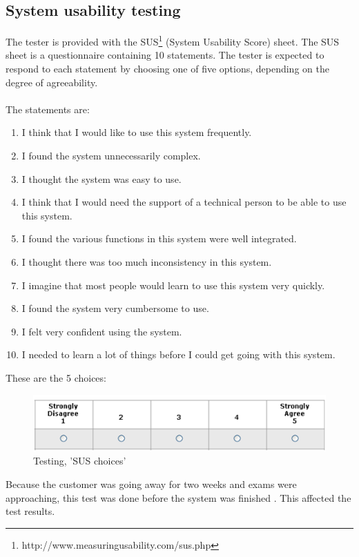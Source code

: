 
\subsection{System usability testing}
The tester is provided with the SUS\footnote{http://www.measuringusability.com/sus.php} (System Usability Score) sheet. The SUS sheet is a questionnaire containing 10 statements. The tester is expected to respond to each statement by choosing one of five options, depending on the degree of agreeability.\\
\\
The statements are:
\begin{enumerate} \setlength{\itemsep}{0cm}\setlength{\parskip}{0cm}
	\item I think that I would like to use this system frequently.
	\item I found the system unnecessarily complex.
	\item I thought the system was easy to use.
	\item I think that I would need the support of a technical person to be able to use this system.
	\item I found the various functions in this system were well integrated.
	\item I thought there was too much inconsistency in this system.
	\item I imagine that most people would learn to use this system very quickly.
	\item I found the system very cumbersome to use.
	\item I felt very confident using the system.
	\item I needed to learn a lot of things before I could get going with this system.
\end{enumerate}
These are the 5 choices:

\begin{figure}[H]
  \centering
    \includegraphics[width=1.0\textwidth]{img/sus-responses.png}
  \caption{Testing, 'SUS choices'} 
  \label{fig:sus_response}
\end{figure}
Because the customer was going away for two weeks and exams were approaching, this test was done before the system was finished . This affected the test results.


